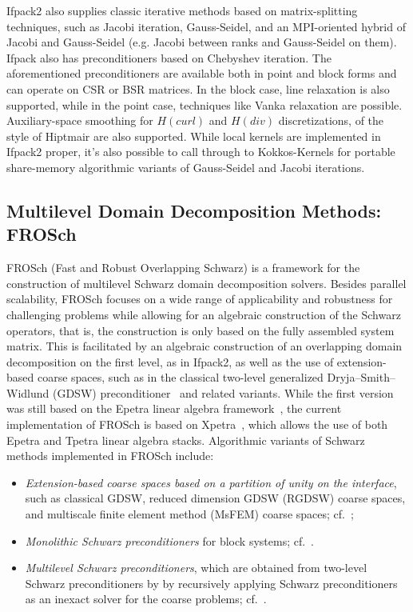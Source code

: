 Ifpack2 also supplies classic iterative methods based on matrix-splitting techniques, such as Jacobi
iteration, Gauss-Seidel, and an MPI-oriented hybrid of Jacobi and
Gauss-Seidel (e.g. Jacobi between ranks and Gauss-Seidel on them).  Ifpack also has preconditioners
based on Chebyshev iteration.  The aforementioned preconditioners are available both in point and block
forms and can operate on CSR or BSR matrices.  In the block case,
line relaxation is also supported, while in the point case, techniques
like Vanka relaxation \cite{Vanka1986} are possible.  Auxiliary-space
smoothing for $H(curl)$ and $H(div)$ discretizations, of the style of
Hiptmair \cite{Hiptmair1997} are also supported.
While local kernels are implemented in Ifpack2 proper, it's also possible to call through
to Kokkos-Kernels for portable share-memory algorithmic variants of Gauss-Seidel and Jacobi iterations.

\subsection{Multilevel Domain Decomposition Methods: FROSch}
\label{ssec:frosch}

FROSch (Fast and Robust Overlapping Schwarz) is a framework for the construction of multilevel Schwarz domain decomposition solvers. Besides parallel scalability, FROSch focuses on a wide range of applicability and robustness for challenging problems while allowing for an algebraic construction of the Schwarz operators, that is, the construction is only based on the fully assembled system matrix. This is facilitated by an algebraic construction of an overlapping domain decomposition on the first level, as in Ifpack2, as well as the use of extension-based coarse spaces, such as in the classical two-level generalized Dryja--Smith--Widlund (GDSW) preconditioner~\cite{dohrmann_domain_2008} and related variants. While the first version was still based on the Epetra linear algebra framework~\cite{heinlein_parallel_2016}, the current implementation of FROSch is based on Xpetra~\cite{heinlein_frosch_2020}, which allows the use of both Epetra and Tpetra linear algebra stacks. Algorithmic variants of Schwarz methods implemented in FROSch include:
\begin{itemize}
	\item \emph{Extension-based coarse spaces based on a partition of unity on the interface}, such as classical GDSW, reduced dimension GDSW (RGDSW) coarse spaces, and multiscale finite element method (MsFEM) coarse spaces; cf.~\cite{heinlein_parallel_2016,heinlein_improving_2018}; 
	\item \emph{Monolithic Schwarz preconditioners} for block systems; cf.~\cite{heinlein_monolithic_2019}.
	\item \emph{Multilevel Schwarz preconditioners}, which are obtained from two-level Schwarz preconditioners by by recursively applying Schwarz preconditioners as an inexact solver for the coarse problems; cf.~\cite{heinlein_parallel_2022}.
\end{itemize}

